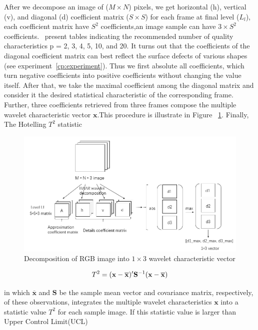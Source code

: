 After we decompose an image of ($M \times N$) pixels, we get horizontal (h), vertical (v), and diagonal (d) coefficient matrix ($S \times S$) for each frame at final level ($L_l$), each coefficient matrix have $S^2$ coefficients,an image sample can have $3 \times S^2$ coefficients.~\cite{montgomery2020introduction} present tables indicating the recommended number of quality characteristics p = 2, 3, 4, 5, 10, and 20. It turns out that the coefficients of the diagonal coefficient matrix can best reflect the surface defects of various shapes (see experiment~\ref{cp:experiment}). Thus we first absolute all coefficients, which turn negative coefficients into positive coefficients without changing the value itself. After that, we take the maximal coefficient among the diagonal matrix and consider it the desired statistical characteristic of the corresponding frame. Further, three coefficients retrieved from three frames compose the multiple wavelet characteristic vector $\mathbf{x}$.This procedure is illustrate in Figure ~\ref{fig:dwt_procedure}. Finally, The Hotelling $T^{2}$ statistic

\begin{figure}[h]
\centering
\includegraphics[width=1\textwidth]{images/haar_decomposition.PNG}
\caption{Decomposition of RGB image into $1\times3$ wavelet characteristic vector}
\label{fig:dwt_procedure}
\end{figure}


\begin{equation}
\centering T^{2}=(\mathbf{x}-\overline{\mathbf{x}})^{\prime} \mathbf{S}^{-1}(\mathbf{x}-\overline{\mathbf{x}}) \label{equa:T2}
\end{equation}

in which $\overline{\mathbf{x}}$ and $\mathbf{S}$ be the sample mean vector and
covariance matrix, respectively, of these observations,
integrates the multiple wavelet characteristics $\mathbf{x}$ into a statistic value $T^{2}$ for each sample image.
If this statistic value is larger than Upper Control Limit(UCL)

